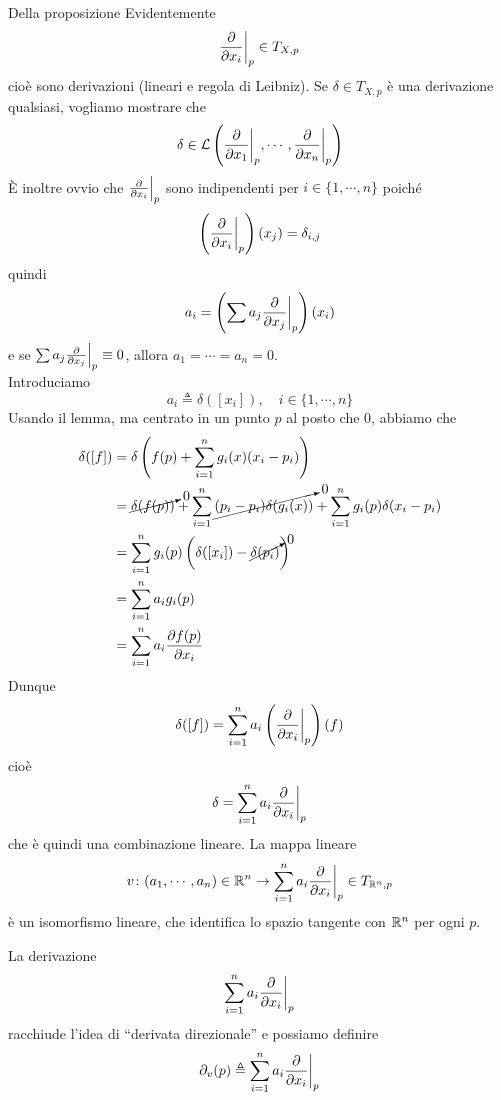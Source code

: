 \documentclass[a4paper]{article}
\begin{document}
\begin{snippetproof}{Della proposizione}
    Evidentemente
    \[
        \restr{\frac{\partial}{\partial x_i}}{p}
        \in T_{X,p}
    \]
    cioè sono derivazioni (lineari e regola di Leibniz).
    Se \(\delta \in T_{X,p}\) è una derivazione qualsiasi, vogliamo mostrare che
    \[
        \delta \in \mathcal L\left(
            \restr{\frac{\partial}{\partial x_1}}{p},
            \cdots,
            \restr{\frac{\partial}{\partial x_n}}{p}
        \right)
    \]
    È inoltre ovvio che \(\restr{\frac{\partial}{\partial x_i}}{p}\)
    sono indipendenti per \(i \in \{1, \cdots, n\}\)
    poiché \[
        \left(\restr{\frac{\partial}{\partial x_i}}{p}\right)(x_j)
        = \delta_{i,j}
    \]
    quindi \[
        a_i = \left(
            \sum a_j \restr{\frac{\partial}{\partial x_j}}{p}
        \right)(x_i)
    \]
    e se \(\sum a_j \restr{\frac{\partial}{\partial x_j}}{p} \equiv 0\),
    allora \(a_1 = \cdots = a_n = 0\). \\
    Introduciamo \[
        a_i \triangleq \delta([x_i]), \quad i \in \{1, \cdots, n\}
    \]
    Usando il lemma, ma centrato in un punto \(p\)
    al posto che \(0\), abbiamo che
    \begin{align*}
        \delta([f]) &= \delta\left(
            f(p) + \sum_{i=1}^n g_i(x)(x_i-p_i)
        \right) \\
        &= \cancelto{0}{\delta(f(p))}
        + \sum_{i=1}^n \cancelto{0}{(p_i-p_i)\delta(g_i(x))}
        + \sum_{i=1}^n g_i(p) \delta(x_i - p_i) \\
        &= \sum_{i=1}^n g_i(p)\left(\delta([x_i]) - \cancelto{0}{\delta(p_i)}\right) \\
        &= \sum_{i=1}^n a_i g_i(p) \\
        &= \sum_{i=1}^n a_i \frac{\partial f(p)}{\partial x_i}
    \end{align*}
    Dunque \[
        \delta([f]) = \sum_{i=1}^n a_i \left(\restr{\frac{\partial}{\partial x_i}}{p}\right)(f)
    \]
    cioè
    \[
        \delta = \sum_{i=1}^n a_i \restr{\frac{\partial}{\partial x_i}}{p}
    \]
    che è quindi una combinazione lineare.
    La mappa lineare \[
        v \colon (a_1, \cdots, a_n) \in \realnumbers^n \fromto
        \sum_{i=1}^n a_i \restr{\frac{\partial}{\partial x_i}}{p} \in T_{\realnumbers^n, p}
    \]
    è un isomorfismo lineare, che identifica lo spazio tangente con \(\mathbb{R}^n\)
    per ogni \(p\).
\end{snippetproof}

La derivazione 
\[
    \sum_{i=1}^n a_i \restr{\frac{\partial}{\partial x_i}}{p}
\]
racchiude l'idea di ``derivata direzionale''
e possiamo definire
\[
    \partial_v(p) \triangleq \sum_{i=1}^n a_i \restr{\frac{\partial}{\partial x_i}}{p}
\]
\end{document}
